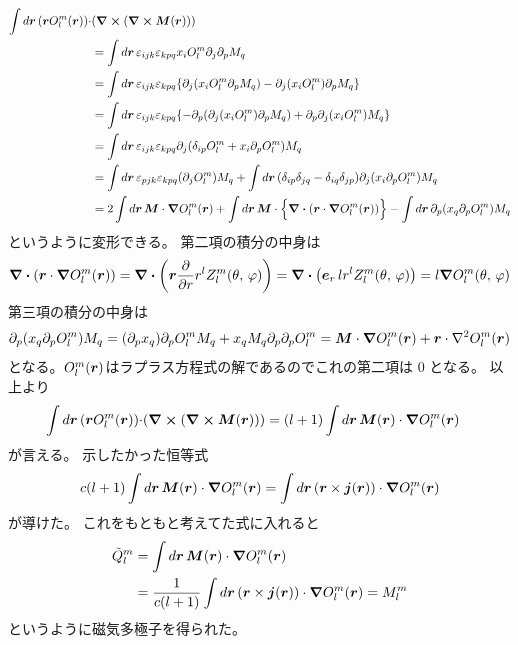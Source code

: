 \documentclass[../master.tex]{subfiles}
\begin{document}
\begin{equation}\begin{aligned}[b]
    \int d\vb*{r}\, (\vb*{r}O_l^m(\vb*{r}))\cdot&(\curl (\curl\vb*{M}(\vb*{r}))) \notag\\
    &=\int d\vb*{r}\, \varepsilon_{ijk}\varepsilon_{kpq} x_i O_l^m \partial_j \partial_p M_q\\
    &=\int d\vb*{r}\, \varepsilon_{ijk}\varepsilon_{kpq}
    \qty{\partial_j(x_i O_l^m \partial_p M_q)-\partial_j(x_i O_l^m)\partial_p M_q}\\
    &=\int d\vb*{r}\, \varepsilon_{ijk}\varepsilon_{kpq}
    \qty{-\partial_p(\partial_j(x_i O_l^m)\partial_p M_q)+ \partial_p\partial_j(x_iO_l^m)M_q}\\
    &=\int d\vb*{r}\, \varepsilon_{ijk}\varepsilon_{kpq}
    \partial_j(\delta_{ip}O_l^m + x_i\partial_pO_l^m)M_q\\
    &=\int d\vb*{r}\, \varepsilon_{pjk}\varepsilon_{kpq} (\partial_j O_l^m)M_q
    +\int d\vb*{r}\, (\delta_{ip}\delta_{jq}-\delta_{iq}\delta_{jp})\partial_j(x_i\partial_p O_l^m)M_q\\
    &=2\int d\vb*{r}\, \vb*{M}\cdot\grad O_l^m(\vb*{r})
    + \int d\vb*{r}\, \vb*{M} \cdot \Bigl\{\div(\vb*{r}\cdot \grad O_l^m(\vb*{r}))\Bigr\}
    -\int d\vb*{r}\, \partial_p(x_q\partial_p O_l^m) M_q
\end{aligned}\end{equation}
というように変形できる。
第二項の積分の中身は
\begin{align}
    \div(\vb*{r}\cdot \grad O_l^m(\vb*{r}))
    = \div(\vb*{r}\pdv{r} r^l Z_l^m(\theta,\,\varphi))
    = \div(\vb*{e}_r \, lr^{l} Z_l^m(\theta,\,\varphi))
    = l\grad O_l^m(\theta,\,\varphi)
\end{align}
第三項の積分の中身は
\begin{align}
    \partial_p(x_q\partial_p O_l^m) M_q
    = (\partial_p x_q) \partial_p O_l^m M_q + x_q M_q \partial_p \partial_p O_l^m
    = \vb*{M} \cdot \grad O_l^m(\vb*{r}) + \vb*{r}\cdot \laplacian O_l^m(\vb*{r})
\end{align}
となる。\(O_l^m(\vb*{r})\)はラプラス方程式の解であるのでこれの第二項は 0 となる。
以上より
\begin{align}
    \int d\vb*{r}\, (\vb*{r}O_l^m(\vb*{r}))\cdot&(\curl (\curl\vb*{M}(\vb*{r})))
    = (l+1)\int d\vb*{r}\, \vb*{M}(\vb*{r})\cdot\grad O_l^m(\vb*{r})
\end{align}
が言える。
示したかった恒等式
\begin{equation}
    c(l+1)\int d\vb*{r}\, \vb*{M}(\vb*{r})\cdot\grad O_l^m(\vb*{r})
    =\int d\vb*{r}\, (\vb*{r}\times\vb*{j}(\vb*{r}))\cdot \grad O_l^m(\vb*{r})
\end{equation}
が導けた。
これをもともと考えてた式に入れると
\begin{equation}\begin{aligned}[b]
    \tilde{Q}_l^m &= \int d\vb*{r}\, \vb*{M}(\vb*{r}) \cdot \grad O_l^m(\vb*{r}) \\
    &=\frac{1}{c(l+1)}\int d\vb*{r}\,(\vb*{r}\times \vb*{j}(\vb*{r}))\cdot \grad O_l^m(\vb*{r}) = M_l^m
\end{aligned}\end{equation}
というように磁気多極子を得られた。
\end{document}
